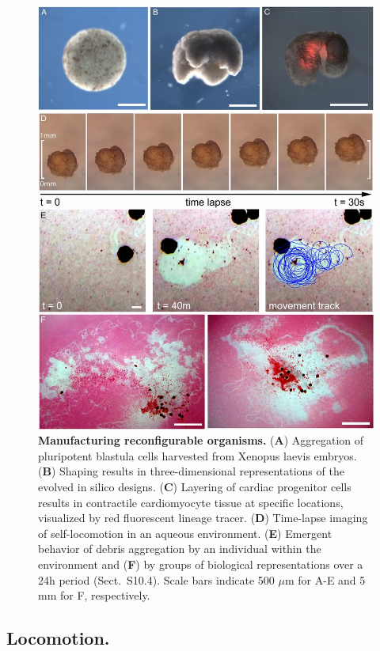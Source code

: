 \begin{figure}[!ht]
\centering
\includegraphics[width=0.857\linewidth]{Chapter07/img/F3.large.jpg}
\caption{\textbf{Manufacturing reconfigurable organisms.} (\textbf{A}) Aggregation of pluripotent blastula cells harvested from Xenopus laevis embryos. (\textbf{B}) Shaping results in three-dimensional representations of the evolved in silico designs. (\textbf{C}) Layering of cardiac progenitor cells results in contractile cardiomyocyte tissue at specific locations, visualized by red fluorescent lineage tracer. (\textbf{D}) Time-lapse imaging of self-locomotion in an aqueous environment. (\textbf{E}) Emergent behavior of debris aggregation by an individual within the environment and (\textbf{F}) by groups of biological representations over a 24h period (Sect.~S10.4). Scale bars indicate 500 {$\mu$}m for A-E and 5 mm for F, respectively.}
\end{figure}


\subsection*{Locomotion.}  

